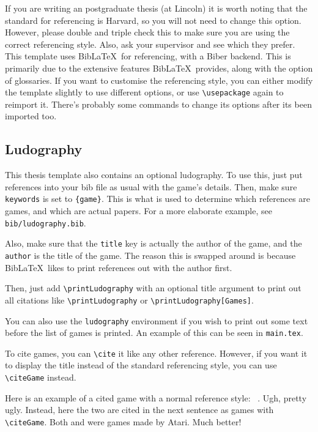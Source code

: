 If you are writing an postgraduate thesis (at Lincoln) it is worth noting that the standard for referencing is Harvard, so you will not need to change this option. However, please double and triple check this to make sure you are using the correct referencing style. Also, ask your supervisor and see which they prefer. This template uses Bib\LaTeX~for referencing, with a Biber backend. This is primarily due to the extensive features Bib\LaTeX~provides, along with the option of glossaries. If you want to customise the referencing style, you can either modify the template slightly to use different options, or use \texttt{\textbackslash usepackage} again to reimport it. There's probably some commands to change its options after its been imported too.

\subsection{Ludography}
This thesis template also contains an optional ludography. To use this, just put references into your bib file as usual with the game's details. Then, make sure \texttt{keywords} is set to \texttt{\{game\}}. This is what is used to determine which references are games, and which are actual papers. For a more elaborate example, see \texttt{bib/ludography.bib}.

Also, make sure that the \texttt{title} key is actually the author of the game, and the \texttt{author} is the title of the game. The reason this is swapped around is because Bib\LaTeX~likes to print references out with the author first.

Then, just add \texttt{\textbackslash printLudography} with an optional title argument to print out all citations like \texttt{\textbackslash printLudography} or \texttt{\textbackslash printLudography[Games]}.

You can also use the \texttt{ludography} environment if you wish to print out some text before the list of games is printed. An example of this can be seen in \texttt{main.tex}.

To cite games, you can \texttt{\textbackslash cite} it like any other reference. However, if you want it to display the title instead of the standard referencing style, you can use \texttt{\textbackslash citeGame} instead.

Here is an example of a cited game with a normal reference style: ~\cite{spaceinvaders}. Ugh, pretty ugly. Instead, here the two are  cited in the next sentence as games with \texttt{\textbackslash citeGame}. Both  and  were games made by Atari. Much better!